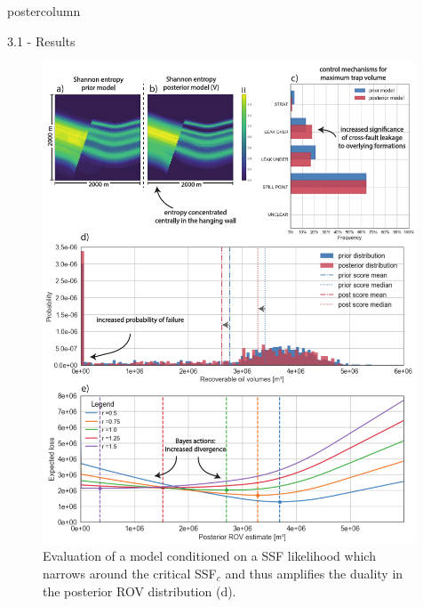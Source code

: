 \documentclass{beamer}
\begin{document}
\begin{frame}
\begin{columns}
\begin{column}{.499\textwidth}
\begin{beamercolorbox}[center]{postercolumn}
\begin{minipage}{.98\textwidth}
{\begin{myblock}{3.1 - Results}
\begin{figure}
\begin{minipage}{0.98\textwidth}
\begin{minipage}[t]{0.49\textwidth}
				\label{fig:ML4}
			\end{minipage}
			\begin{minipage}[t]{0.49\textwidth}
				\centering\includegraphics[width=0.99\textwidth]{figures/ML5}
				\caption{Evaluation of a model conditioned on a SSF likelihood which narrows around the critical SSF$_c$ and thus amplifies the duality in the posterior ROV distribution (d).}
				\label{fig:ML5}
			\end{minipage}	
		\end{minipage}
	\end{figure}


\end{myblock}}
\end{minipage}
\end{beamercolorbox}
\end{column}
\end{columns}
\end{frame}
\end{document}
